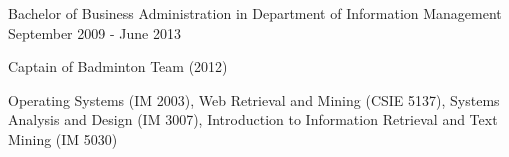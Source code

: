 \begin{cventries}
  \cventry
    {Bachelor of Business Administration in Department of Information Management} %
    {} %
    {} %
    {September 2009 - June 2013} %
    {
      \begin{cvitems} %
        \item {Captain of Badminton Team (2012)}
        \item {Operating Systems (IM 2003), Web Retrieval and Mining (CSIE 5137), Systems Analysis and Design (IM 3007), Introduction to Information Retrieval and Text Mining (IM 5030)}
      \end{cvitems}
    }

\end{cventries}
